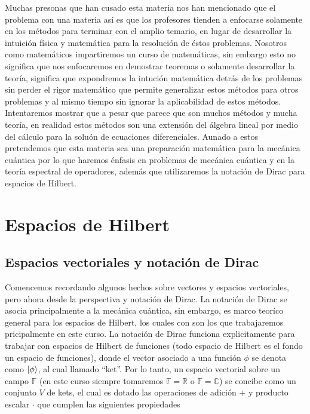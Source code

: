 \documentclass[letterpaper]{book}
\begin{document}
Muchas presonas que han cusado esta materia nos han mencionado que el problema con una materia así es que los profesores tienden a enfocarse solamente en los métodos para terminar con el amplio temario, en lugar de desarrollar la intuición física y matemática para la resolución de éstos problemas. Nosotros como matemáticos impartiremos un curso de matemáticas, sin embargo esto no significa que nos enfocaremos en demostrar teoremas o solamente desarrollar la teoría, significa que expondremos la intución matemática detrás de los problemas sin perder el rigor matemático que permite generalizar estos métodos para otros problemas y al mismo tiempo sin ignorar la aplicabilidad de estos métodos. Intentaremos mostrar que a pesar que parece que son muchos métodos y mucha teoría, en realidad estos métodos son una extensión del álgebra lineal por medio del cálculo para la soluón de ecuaciones diferenciales. Aunado a estos pretendemos que esta materia sea una preparación matemática para la mecánica cuántica por lo que haremos énfasis en problemas de mecánica cuántica y en la teoría espectral de operadores, además que utilizaremos la notación de Dirac para espacios de Hilbert.\\

\chapter{Espacios de Hilbert}

\section{Espacios vectoriales y notación de Dirac}

\noindent Comencemos recordando algunos hechos sobre vectores y espacios vectoriales, pero ahora desde la perspectiva y notación de Dirac. La notación de Dirac se asocia principalmente a la mecánica cuántica, sin embargo, es marco teoríco general para los espacios de Hilbert, los cuales con son los que trabajaremos pricipalmente en este curso. La notación de Dirac funciona explicitamente para trabajar con espacios de Hilbert de funciones (todo espacio de Hilbert es el fondo un espacio de funciones), donde el vector asociado a una función $\phi$ se denota como $\ket{\phi}$, al cual llamado ``ket''. Por lo tanto, un espacio vectorial sobre un campo \(\mathbb{F}\) (en este curso siempre tomaremos \(\mathbb{F} = \mathbb{R}\) o \(\mathbb{F} = \mathbb{C}\)) se concibe como un conjunto \(V\) de kets, el cual es dotado las operaciones de adición \(+\) y producto escalar \(\cdot\) que cumplen las siguientes propiedades
\end{document}
